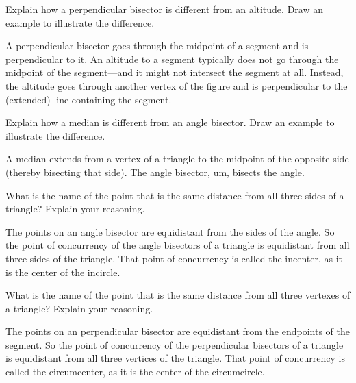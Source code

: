 \documentclass[nooutcomes]{ximera}
\begin{document}
\begin{problem}
Explain how a perpendicular bisector is different from an
  altitude. Draw an example to illustrate the difference.
\begin{freeResponse}
\begin{hint}
A perpendicular bisector goes through the midpoint of a segment and is perpendicular to it.  An altitude to a segment typically does not go through the midpoint of the segment---and it might not intersect the segment at all.  Instead, the altitude goes through another vertex of the figure and is perpendicular to the (extended) line containing the segment.    
\end{hint}
\end{freeResponse}
\end{problem}

\begin{problem}
Explain how a median is different from an angle bisector.  Draw an
  example to illustrate the difference.
\begin{freeResponse}
\begin{hint}
A median extends from a vertex of a triangle to the midpoint of the opposite side (thereby bisecting that side).  The angle bisector, um, bisects the angle.
\end{hint}
\end{freeResponse}
\end{problem}

\begin{problem}
What is the name of the point that is the same distance from all
  three sides of a triangle? Explain your reasoning.
\begin{freeResponse}
\begin{hint}
The points on an angle bisector are equidistant from the sides of the angle.  So the point of concurrency of the angle bisectors of a triangle is equidistant from all three sides of the triangle.  That point of concurrency is called the incenter, as it is the center of the incircle.  
\end{hint}
\end{freeResponse}
\end{problem}

\begin{problem}
What is the name of the point that is the same distance from all
  three vertexes of a triangle? Explain your reasoning.
\begin{freeResponse}
\begin{hint}
The points on an perpendicular bisector are equidistant from the endpoints of the segment.  So the point of concurrency of the perpendicular bisectors of a triangle is equidistant from all three vertices of the triangle.  That point of concurrency is called the circumcenter, as it is the center of the circumcircle.  
\end{hint}
\end{freeResponse}
\end{problem}
\end{document}
